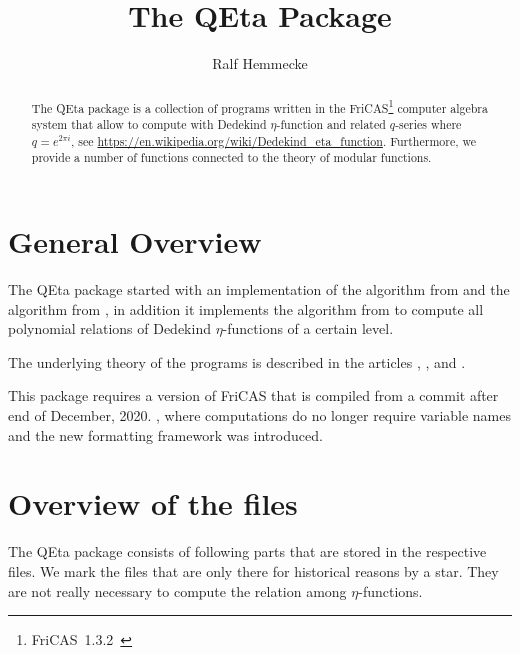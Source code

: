 \documentclass{article}
\begin{document}
\title{The QEta Package}
\author{Ralf Hemmecke}
\maketitle
\begin{abstract}
  The QEta package is a collection of programs written in the
  FriCAS\footnote{FriCAS~1.3.2~\cite{FriCAS}} computer algebra system
  that allow to compute with Dedekind $\eta$-function and related
  $q$-series where $q=e^{2\pi i}$, see
  \url{https://en.wikipedia.org/wiki/Dedekind_eta_function}.
  Furthermore, we provide a number of functions connected to the
  theory of modular functions.
\end{abstract}

\tableofcontents

\section{General Overview}

The QEta package started with an implementation of the 
algorithm from \cite{Radu:RamanujanKolberg:2015} and the \algoSamba{}
algorithm from \cite{Hemmecke:DancingSambaRamanujan:2018}, in addition
it implements the algorithm from
\cite{Hemmecke+Radu:EtaRelations:2018} to compute all polynomial
relations of Dedekind $\eta$-functions of a certain level.

The underlying theory of the programs is described in the articles
\cite{Radu:RamanujanKolberg:2015},
\cite{Hemmecke:DancingSambaRamanujan:2018}, and
\cite{Hemmecke+Radu:EtaRelations:2018}.

This package requires a version of FriCAS that is compiled from a
commit after end of December, 2020. \ie, where \GB{} computations do
no longer require variable names and the new formatting framework was
introduced.

\section{Overview of the files}

The QEta package consists of following parts that are stored in the
respective  files. We mark the files that are only
there for historical reasons by a star. They are not really necessary
to compute the relation among $\eta$-functions.
\end{document}
